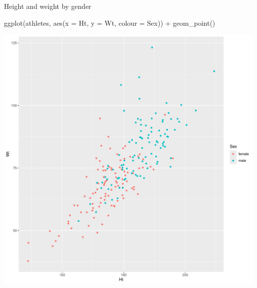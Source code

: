 \documentclass[
  ignorenonframetext,
]{beamer}
\newenvironment{Shaded}{\begin{snugshade}}{\end{snugshade}}
\newcommand{\AttributeTok}[1]{\textcolor[rgb]{0.40,0.45,0.13}{#1}}
\newcommand{\FunctionTok}[1]{\textcolor[rgb]{0.28,0.35,0.67}{#1}}
\newcommand{\NormalTok}[1]{\textcolor[rgb]{0.00,0.23,0.31}{#1}}
\newcommand{\SpecialCharTok}[1]{\textcolor[rgb]{0.37,0.37,0.37}{#1}}
\begin{document}
\begin{frame}[fragile]{Height and weight by gender}
\label{height-and-weight-by-gender}
\begin{Shaded}
\begin{Highlighting}[]
\FunctionTok{ggplot}\NormalTok{(athletes, }\FunctionTok{aes}\NormalTok{(}\AttributeTok{x =}\NormalTok{ Ht, }\AttributeTok{y =}\NormalTok{ Wt, }\AttributeTok{colour =}\NormalTok{ Sex)) }\SpecialCharTok{+}
  \FunctionTok{geom\_point}\NormalTok{()}
\end{Highlighting}
\end{Shaded}

\includegraphics{graphs_files/figure-beamer/unnamed-chunk-2-1.pdf}
\end{frame}
\end{document}
